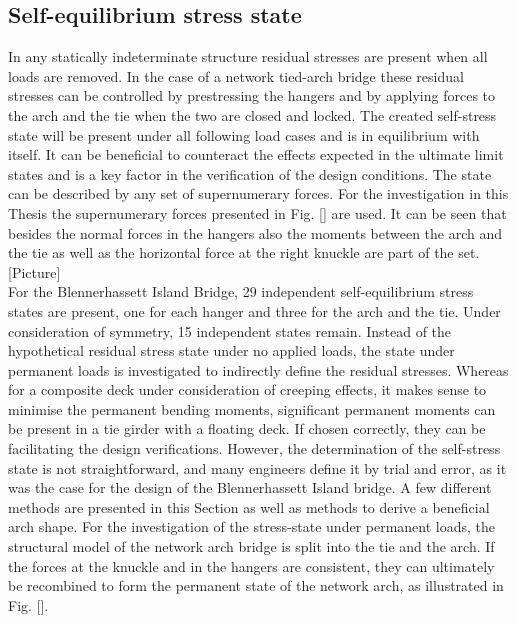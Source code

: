 


\newpage
\subsection{Self-equilibrium stress state} \label{sec:met_seq}
In any statically indeterminate structure residual stresses are present when all loads are removed. In the case of a network tied-arch bridge these residual stresses can be controlled by prestressing the hangers and by applying forces to the arch and the tie when the two are closed and locked. The created self-stress state will be present under all following load cases and is in equilibrium with itself. It can be beneficial to counteract the effects expected in the ultimate limit states and is a key factor in the verification of the design conditions. The state can be described by any set of supernumerary forces. For the investigation in this Thesis the supernumerary forces presented in Fig. [] are used. It can be seen that besides the normal forces in the hangers also the moments between the arch and the tie as well as the horizontal force at the right knuckle are part of the set.\\

[Picture]\\

For the Blennerhassett Island Bridge, 29 independent self-equilibrium stress states are present, one for each hanger and three for the arch and the tie. Under consideration of symmetry, 15 independent states remain. Instead of the hypothetical residual stress state under no applied loads, the state under permanent loads is investigated to indirectly define the residual stresses. Whereas for a composite deck under consideration of creeping effects, it makes sense to minimise the permanent bending moments, significant permanent moments can be present in a tie girder with a floating deck. If chosen correctly, they can be facilitating the design verifications. However, the determination of the self-stress state is not straightforward, and many engineers define it by trial and error, as it was the case for the design of the Blennerhassett Island bridge. A few different methods are presented in this Section as well as methods to derive a beneficial arch shape. For the investigation of the stress-state under permanent loads, the structural model of the network arch bridge is split into the tie and the arch. If the forces at the knuckle and in the hangers are consistent, they can ultimately be recombined to form the permanent state of the network arch, as illustrated in Fig. []. \\

